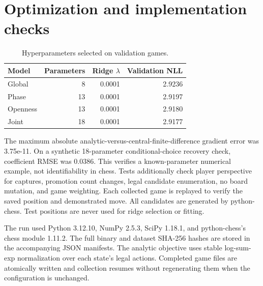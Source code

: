 \documentclass[11pt]{article}
\begin{document}
\section{Optimization and implementation checks}
\begin{table}[ht]\centering
\caption{Hyperparameters selected on validation games.}\label{tab:hyper}
\begin{tabular}{lrrr}\toprule
Model & Parameters & Ridge $\lambda$ & Validation NLL\\\midrule
Global & 8 & 0.0001 & 2.9236\\
Phase & 13 & 0.0001 & 2.9197\\
Openness & 13 & 0.0001 & 2.9180\\
Joint & 18 & 0.0001 & 2.9177\\
\bottomrule\end{tabular}\end{table}
The maximum absolute analytic-versus-central-finite-difference gradient error was 3.75e-11. On a synthetic 18-parameter conditional-choice recovery check, coefficient RMSE was 0.0386. This verifies a known-parameter numerical example, not identifiability in chess. Tests additionally check player perspective for captures, promotion count changes, legal candidate enumeration, no board mutation, and game weighting. Each collected game is replayed to verify the saved position and demonstrated move. All candidates are generated by python-chess. Test positions are never used for ridge selection or fitting.

The run used Python 3.12.10, NumPy 2.5.3, SciPy 1.18.1, and python-chess's chess module 1.11.2. The full binary and dataset SHA-256 hashes are stored in the accompanying JSON manifests. The analytic objective uses stable log-sum-exp normalization over each state's legal actions. Completed game files are atomically written and collection resumes without regenerating them when the configuration is unchanged.
\end{document}
